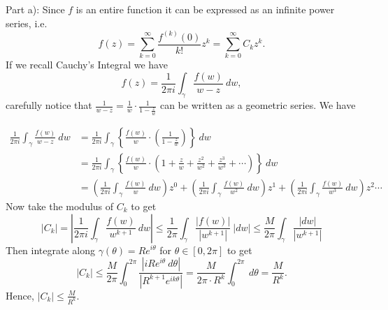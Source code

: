 \documentclass[12pt]{article}
\newenvironment{solution}[2][Solution]{\begin{trivlist}
\item[\hskip \labelsep {\bfseries #1}]}{\end{trivlist}}
\begin{document}
\begin{solution}{}
Part a): Since $f$ is an entire function it can be expressed as an infinite power series, i.e.
\[
f(z)=\sum_{k=0}^\infty\frac{f^{(k)}(0)}{k!}z^k=\sum_{k=0}^\infty C_kz^k.
\]
If we recall Cauchy's Integral we have
\[
f(z)=\frac{1}{2\pi i}\int_\gamma\frac{f(w)}{w-z}\ dw,
\]
carefully notice that $\frac{1}{w-z}=\frac{1}{w}\cdot\frac{1}{1-\frac{z}{w}}$ can be written as a geometric series. We have

\begin{align*}
\frac{1}{2\pi i}\int_\gamma\frac{f(w)}{w-z}\ dw &=\frac{1}{2\pi i}\int_\gamma\left\lbrace\frac{f(w)}{w}\cdot\left(\frac{1}{1-\frac{z}{w}}\right) \right\rbrace\ dw\\[8pt]
&=\frac{1}{2\pi i}\int_\gamma\left\lbrace\frac{f(w)}{w}\cdot\left(1+\frac{z}{w}+\frac{z^2}{w^2}+\frac{z^3}{w^3}+\cdots\right) \right\rbrace\ dw\\[8pt]
&=\left(\frac{1}{2\pi i}\int_\gamma \frac{f(w)}{w}\ dw\right)z^0+\left(\frac{1}{2\pi i}\int_\gamma \frac{f(w)}{w^2}\ dw\right)z^1+\left(\frac{1}{2\pi i}\int_\gamma \frac{f(w)}{w^3}\ dw\right)z^2\cdots
\end{align*}
Now take the modulus of $C_k$ to get
\[
|C_k|=\left\lvert\frac{1}{2\pi i}\int_\gamma \frac{f(w)}{w^{k+1}}\ dw \right\rvert\leq\frac{1}{2\pi}\int_\gamma\frac{|f(w)|}{|w^{k+1}|}\ |dw|\leq \frac{M}{2\pi}\int_\gamma\frac{|dw|}{|w^{k+1}|}
\]
Then integrate along $\gamma(\theta)=Re^{i\theta}$ for $\theta\in [0,2\pi]$ to get
\[
|C_k|\leq \frac{M}{2\pi}\int_0^{2\pi}\frac{|iRe^{i\theta}\ d\theta|}{|R^{k+1}e^{ik\theta}|}=\frac{M}{2\pi\cdot R^k}\int_0^{2\pi}\ d\theta=\frac{M}{R^k}.
\]
Hence, $|C_k|\leq \frac{M}{R^k}$.
\end{solution}
\pagebreak
\end{document}
